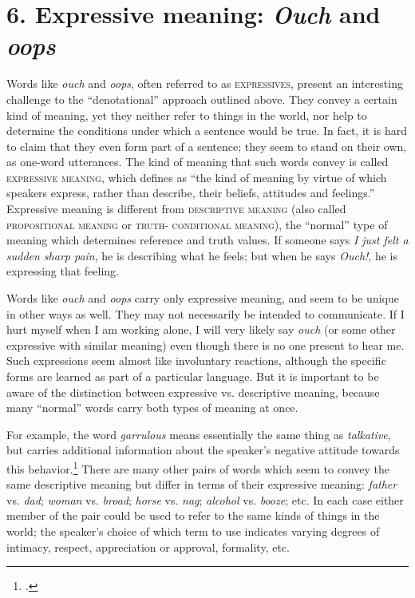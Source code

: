\section{6. Expressive meaning: \textit{Ouch} and \textit{oops}}\label{sec:}

Words like \textit{ouch} and \textit{oops}, often referred to as \textsc{expressives}, present an interesting challenge to the “denotational” approach outlined above. They convey a certain kind of meaning, yet they neither refer to things in the world, nor help to determine the conditions under which a sentence would be true. In fact, it is hard to claim that they even form part of a sentence; they seem to stand on their own, as one-word utterances. The kind of meaning that such words convey is called \textsc{expressive meaning}, which \citet[44]{Lyons1995} defines as “the kind of meaning by virtue of which speakers express, rather than describe, their beliefs, attitudes and feelings.” Expressive meaning is different from \textsc{descriptive meaning} (also called \textsc{propositional meaning} or \textsc{truth-} \textsc{conditional} \textsc{meaning}), the “normal” type of meaning which determines reference and truth values. If someone says \textit{I just felt a sudden sharp pain}, he is describing what he feels; but when he says \textit{Ouch!}, he is expressing that feeling.



Words like \textit{ouch} and \textit{oops} carry only expressive meaning, and seem to be unique in other ways as well. They may not necessarily be intended to communicate. If I hurt myself when I am working alone, I will very likely say \textit{ouch} (or some other expressive with similar meaning) even though there is no one present to hear me. Such expressions seem almost like involuntary reactions, although the specific forms are learned as part of a particular language. But it is important to be aware of the distinction between expressive vs. descriptive meaning, because many “normal” words carry both types of meaning at once.



For example, the word \textit{garrulous} means essentially the same thing as \textit{talkative}, but carries additional information about the speaker’s negative attitude towards this behavior.\footnote{\citet{Barker2001}.} There are many other pairs of words which seem to convey the same descriptive meaning but differ in terms of their expressive meaning: \textit{father} vs. \textit{dad}; \textit{woman} vs. \textit{broad}; \textit{horse} vs. \textit{nag}; \textit{alcohol} vs. \textit{booze}; etc. In each case either member of the pair could be used to refer to the same kinds of things in the world; the speaker’s choice of which term to use indicates varying degrees of intimacy, respect, appreciation or approval, formality, etc.



